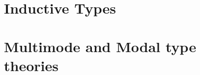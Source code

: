 \documentclass[../thesis.tex]{subfiles}
\begin{document}
\section{Inductive Types}

\section{Multimode and Modal type theories}

\ifSubfilesClassLoaded{\printbibliography}{}
\end{document}
